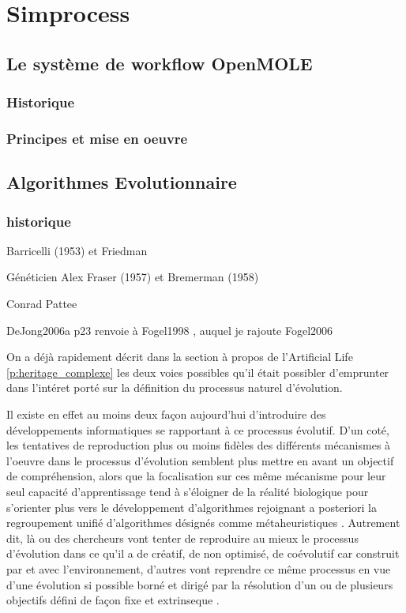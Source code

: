 
\section{Simprocess}
\label{sec:simprocess}

\subsection{Le système de workflow OpenMOLE}

\subsubsection{Historique}



\subsubsection{Principes et mise en oeuvre}


\subsection{Algorithmes Evolutionnaire}


\subsubsection{historique}

Barricelli (1953) et Friedman

Généticien Alex Fraser (1957)
et Bremerman (1958)

Conrad Pattee

DeJong2006a p23 renvoie à Fogel1998 , auquel je rajoute Fogel2006

On a déjà rapidement décrit dans la section à propos de l'Artificial Life \ref{p:heritage_complexe} les deux voies possibles qu'il était possibler d'emprunter dans l'intéret porté sur la définition du processus naturel d'évolution. 

Il existe en effet au moins deux façon aujourd'hui d'introduire des développements informatiques se rapportant à ce processus évolutif. D'un coté, les tentatives de reproduction plus ou moins fidèles des différents mécanismes à l'oeuvre dans le processus d'évolution semblent plus mettre en avant un objectif de compréhension, alors que la focalisation sur ces même mécanisme pour leur seul capacité d'apprentissage tend à s'éloigner de la réalité biologique pour s'orienter plus vers le développement d'algorithmes rejoignant a posteriori la regroupement unifié d'algorithmes désignés comme métaheuristiques . Autrement dit, là ou des chercheurs vont tenter de reproduire au mieux le processus d'évolution dans ce qu'il a de créatif, de non optimisé, de coévolutif car construit par  et avec l'environnement, d'autres vont reprendre ce même processus en vue d'une évolution si possible borné et dirigé par la résolution d'un ou de plusieurs objectifs défini de façon fixe et extrinseque \autocites{Taylor2001, Taylor2012}.

